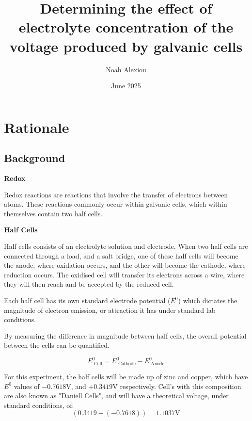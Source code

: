 \documentclass[11pt,a4paper]{article}
\begin{document}
	\nocite{*}
	
	\begin{titlepage}
		
		
		\title{Determining the effect of electrolyte concentration of the voltage produced by galvanic cells}
		
		\author{Noah Alexiou}
		
		
		\date{June 2025}
		
		\maketitle
		\centering
		
	\end{titlepage}
	\tableofcontents
	\newpage
	
	
	\section{Rationale}
	
	
	\subsection{Background}

	

	\textbf{Redox}
	
	Redox reactions are reactions that involve the transfer of electrons between atoms. These reactions commonly occur within galvanic cells, which within themselves contain two half cells. 
	

	\textbf{Half Cells}
	
	Half cells consists of an electrolyte solution and electrode. When two half cells are connected through a load, and a salt  bridge, one of these half cells will become the anode, where oxidation occurs, and the other will become the cathode, where reduction occurs. The oxidised cell will transfer its electrons across a wire, where they will then reach and be accepted by the reduced cell.
	
	Each half cell has its own standard electrode potential ($E^0$) which dictates the magnitude of electron emission, or attraction it has under standard lab conditions. 
	
	By measuring the difference in magnitude between half cells, the overall potential between the cells can be quantified. 
	
	$$
	E^0_{\textrm{ Cell}}=E^0_{\textrm{ Cathode}}-E^0_{\textrm{ Anode}}
	$$
	
	For this experiment, the half cells will be made up of zinc and copper, which have $E^0$ values of $-0.7618$V, and $+0.3419$V respectively. Cell's with this composition are also known as "Daniell Cells", and will have a theoretical voltage, under standard conditions, of: $$(0.3419-(-0.7618))=1.1037\textrm{V}$$
	
\end{document}
